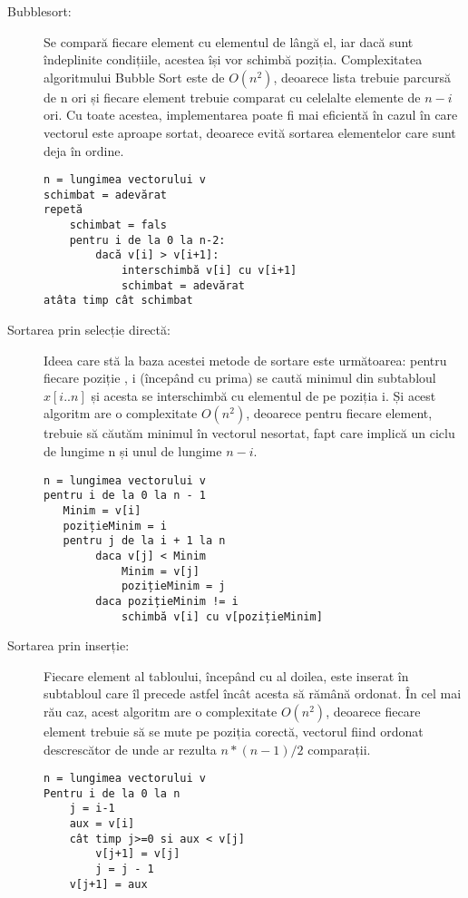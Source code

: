 \documentclass[12pt]{article}
\begin{document}
\begin{description}

\item[Bubblesort:]
Se compară fiecare element cu elementul de lângă el, iar dacă sunt îndeplinite condițiile, acestea își vor schimbă poziția. Complexitatea algoritmului Bubble Sort este de $O(n^2)$, deoarece lista trebuie parcursă de n ori și fiecare element trebuie comparat cu celelalte elemente de $n-i$ ori. Cu toate acestea, implementarea poate fi mai eficientă în cazul în care vectorul este aproape sortat, deoarece evită sortarea elementelor care sunt deja în ordine.
\begin{verbatim}
n = lungimea vectorului v
schimbat = adevărat
repetă
    schimbat = fals
    pentru i de la 0 la n-2:
        dacă v[i] > v[i+1]:
            interschimbă v[i] cu v[i+1]
            schimbat = adevărat
atâta timp cât schimbat
\end{verbatim}
\item[Sortarea prin selecție directă:]
Ideea care stă la baza acestei metode de sortare este următoarea:
pentru fiecare poziție , i (începând cu prima) se caută minimul din subtabloul $x[i..n]$ și acesta se interschimbă cu elementul de pe poziția i.
Și acest algoritm are o complexitate $O(n^2)$, deoarece pentru fiecare element, trebuie să căutăm minimul în vectorul nesortat, fapt care implică un ciclu de lungime n și unul de lungime $n-i$.

\begin{verbatim}
n = lungimea vectorului v
pentru i de la 0 la n - 1
   Minim = v[i]
   pozițieMinim = i
   pentru j de la i + 1 la n
        daca v[j] < Minim
            Minim = v[j]
            pozițieMinim = j
        daca pozițieMinim != i
            schimbă v[i] cu v[pozițieMinim]

\end{verbatim}
\item[Sortarea prin inserție:] 
Fiecare element al tabloului, începând cu al doilea, este inserat în subtabloul care îl precede astfel încât acesta să rămână ordonat.
În cel mai rău caz, acest algoritm are o complexitate $O(n^2)$, deoarece fiecare element trebuie să se mute pe poziția corectă, vectorul fiind ordonat descrescător de unde ar rezulta $n*(n-1)/2$ comparații.
\begin{verbatim}
n = lungimea vectorului v
Pentru i de la 0 la n 
    j = i-1
    aux = v[i]
    cât timp j>=0 si aux < v[j] 
        v[j+1] = v[j]
        j = j - 1
    v[j+1] = aux
\end{verbatim}


\end{description}
\end{document}
